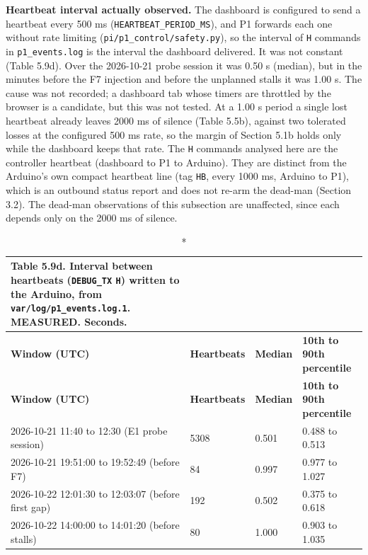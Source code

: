 \textbf{Heartbeat interval actually observed.} The dashboard is configured to send a heartbeat every 500 ms (\texttt{HEARTBEAT\_PERIOD\_MS}), and P1 forwards each one without rate limiting (\texttt{pi/p1\_control/safety.py}), so the interval of \texttt{H} commands in \texttt{p1\_events.log} is the interval the dashboard delivered. It was not constant (Table 5.9d). Over the 2026-10-21 probe session it was 0.50 s (median), but in the minutes before the F7 injection and before the unplanned stalls it was 1.00 s. The cause was not recorded; a dashboard tab whose timers are throttled by the browser is a candidate, but this was not tested. At a 1.00 s period a single lost heartbeat already leaves 2000 ms of silence (Table 5.5b), against two tolerated losses at the configured 500 ms rate, so the margin of Section 5.1b holds only while the dashboard keeps that rate. The \texttt{H} commands analysed here are the controller heartbeat (dashboard to P1 to Arduino). They are distinct from the Arduino's own compact heartbeat line (tag \texttt{HB}, every 1000 ms, Arduino to P1), which is an outbound status report and does not re-arm the dead-man (Section 3.2). The dead-man observations of this subsection are unaffected, since each depends only on the 2000 ms of silence.

\begin{center}
\begin{longtable}{|p{5.5cm}|l|l|l|}
\caption*{Table 5.9d. Interval between heartbeats (\texttt{DEBUG\_TX} \texttt{H}) written to the Arduino, from \texttt{var/log/p1\_events.log.1}. MEASURED. Seconds.}
\addcontentsline{lot}{table}{\protect\numberline{5.9d}Interval between heartbeats (\texttt{DEBUG\_TX} \texttt{H}) written to the Arduino, from \texttt{var/log/p1\_events.log.1}. MEASURED. Seconds.}
\\
\hline
\textbf{Window (UTC)} & \textbf{Heartbeats} & \textbf{Median} & \textbf{10th to 90th percentile} \\
\hline
\endfirsthead
\hline
\textbf{Window (UTC)} & \textbf{Heartbeats} & \textbf{Median} & \textbf{10th to 90th percentile} \\
\hline
\endhead
2026-10-21 11:40 to 12:30 (E1 probe session) & 5308 & 0.501 & 0.488 to 0.513 \\
\hline
2026-10-21 19:51:00 to 19:52:49 (before F7) & 84 & 0.997 & 0.977 to 1.027 \\
\hline
2026-10-22 12:01:30 to 12:03:07 (before first gap) & 192 & 0.502 & 0.375 to 0.618 \\
\hline
2026-10-22 14:00:00 to 14:01:20 (before stalls) & 80 & 1.000 & 0.903 to 1.035 \\
\hline
\end{longtable}
\end{center}

